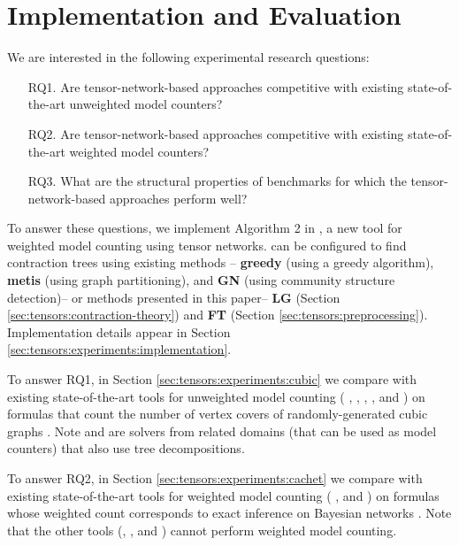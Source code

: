 \section{Implementation and Evaluation} \label{sec:tensors:experiments}
We are interested in the following experimental research questions:
\begin{enumerate}
    \item[RQ1.] Are tensor-network-based approaches competitive with existing state-of-the-art unweighted model counters?
    \item[RQ2.] Are tensor-network-based approaches competitive with existing state-of-the-art weighted model counters?
    \item[RQ3.] What are the structural properties of benchmarks for which the tensor-network-based approaches perform well?
\end{enumerate}

To answer these questions, we implement Algorithm 2 in , a new tool for weighted model counting using tensor networks.  can be configured to find contraction trees using existing methods \cite{KCMR18}-- \textbf{greedy} (using a greedy algorithm), \textbf{metis} (using graph partitioning), and \textbf{GN} (using community structure detection)-- or methods presented in this paper-- \textbf{LG} (Section \ref{sec:tensors:contraction-theory}) and \textbf{FT} (Section \ref{sec:tensors:preprocessing}). Implementation details appear in Section \ref{sec:tensors:experiments:implementation}.

To answer RQ1, in Section \ref{sec:tensors:experiments:cubic} we compare  with existing state-of-the-art tools for unweighted model counting ( \cite{CW16},  \cite{FHMW17},  \cite{Thurley2006},  \cite{SBK05},  \cite{OD15} and  \cite{LM17}) on formulas that count the number of vertex covers of randomly-generated cubic graphs \cite{KCMR18}. Note  and  are solvers from related domains (that can be used as model counters) that also use tree decompositions.

To answer RQ2, in Section \ref{sec:tensors:experiments:cachet} we compare  with existing state-of-the-art tools for weighted model counting ( \cite{SBK05},  \cite{OD15} and  \cite{LM17}) on formulas whose weighted count corresponds to exact inference on Bayesian networks \cite{SBK05}. Note that the other tools (, , and ) cannot perform weighted model counting.

